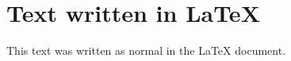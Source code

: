 \documentclass[
]{article}
\begin{document}
\section{Text written in \LaTeX}

This text was written as normal in the \LaTeX{} document.


\end{document}
